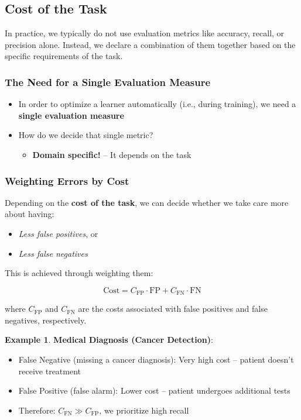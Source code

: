 \documentclass[11pt,a4paper]{article}
\theoremstyle{definition}
\newtheorem{example}{Example}[section]
\theoremstyle{plain}
\theoremstyle{remark}
\begin{document}
\subsection{Cost of the Task}

In practice, we typically do not use evaluation metrics like accuracy, recall, or precision alone. Instead, we declare a combination of them together based on the specific requirements of the task.

\subsubsection{The Need for a Single Evaluation Measure}

\begin{itemize}
    \item In order to optimize a learner automatically (i.e., during training), we need a \textbf{single evaluation measure}
    \item How do we decide that single metric?
    \begin{itemize}
        \item \textbf{Domain specific!} – It depends on the task
    \end{itemize}
\end{itemize}

\subsubsection{Weighting Errors by Cost}

Depending on the \textbf{cost of the task}, we can decide whether we take care more about having:
\begin{itemize}
    \item \textit{Less false positives}, or
    \item \textit{Less false negatives}
\end{itemize}

This is achieved through weighting them:

\begin{equation}
\text{Cost} = C_{\text{FP}} \cdot \text{FP} + C_{\text{FN}} \cdot \text{FN}
\end{equation}

where $C_{\text{FP}}$ and $C_{\text{FN}}$ are the costs associated with false positives and false negatives, respectively.

\begin{example}
\textbf{Medical Diagnosis (Cancer Detection)}:
\begin{itemize}
    \item False Negative (missing a cancer diagnosis): Very high cost – patient doesn't receive treatment
    \item False Positive (false alarm): Lower cost – patient undergoes additional tests
    \item Therefore: $C_{\text{FN}} \gg C_{\text{FP}}$, we prioritize high recall
\end{itemize}
\end{example}
\end{document}
